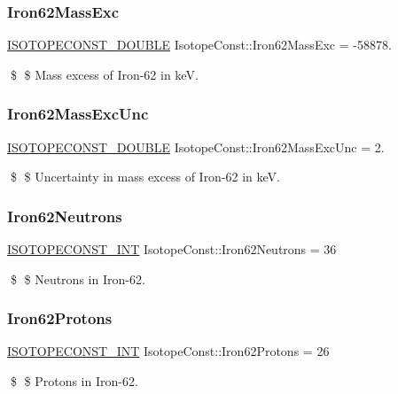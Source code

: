 \subsubsection{\texorpdfstring{Iron62\+Mass\+Exc}{Iron62MassExc}}
{\footnotesize\ttfamily \mbox{\hyperlink{group___isotope_const-_macros_ga8f45a7272ce02c0b4c65c44636ed719a}{I\+S\+O\+T\+O\+P\+E\+C\+O\+N\+S\+T\+\_\+\+D\+O\+U\+B\+LE}} Isotope\+Const\+::\+Iron62\+Mass\+Exc = -\/58878.}

\$ \$ Mass excess of Iron-\/62 in keV. \mbox{\label{group___isotope_const-_iron-_fe62_ga3a9c6d335ced4c4ce7a43a864c6dc4e3}} 
\subsubsection{\texorpdfstring{Iron62\+Mass\+Exc\+Unc}{Iron62MassExcUnc}}
{\footnotesize\ttfamily \mbox{\hyperlink{group___isotope_const-_macros_ga8f45a7272ce02c0b4c65c44636ed719a}{I\+S\+O\+T\+O\+P\+E\+C\+O\+N\+S\+T\+\_\+\+D\+O\+U\+B\+LE}} Isotope\+Const\+::\+Iron62\+Mass\+Exc\+Unc = 2.}

\$ \$ Uncertainty in mass excess of Iron-\/62 in keV. \mbox{\label{group___isotope_const-_iron-_fe62_ga828b0d511fa22f6b52671ec3c17a2245}} 
\subsubsection{\texorpdfstring{Iron62\+Neutrons}{Iron62Neutrons}}
{\footnotesize\ttfamily \mbox{\hyperlink{group___isotope_const-_macros_ga5f18360b3e99483a35c32d789e62621c}{I\+S\+O\+T\+O\+P\+E\+C\+O\+N\+S\+T\+\_\+\+I\+NT}} Isotope\+Const\+::\+Iron62\+Neutrons = 36}

\$ \$ Neutrons in Iron-\/62. \mbox{\label{group___isotope_const-_iron-_fe62_ga0a6cd25ba63a4433b9a744f737fca378}} 
\subsubsection{\texorpdfstring{Iron62\+Protons}{Iron62Protons}}
{\footnotesize\ttfamily \mbox{\hyperlink{group___isotope_const-_macros_ga5f18360b3e99483a35c32d789e62621c}{I\+S\+O\+T\+O\+P\+E\+C\+O\+N\+S\+T\+\_\+\+I\+NT}} Isotope\+Const\+::\+Iron62\+Protons = 26}

\$ \$ Protons in Iron-\/62. 